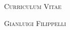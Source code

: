 \documentclass[a4paper,latin1,italian]{article}
\begin{document}
\pagestyle{empty}

\begin{center}
\huge{\textsc{Curriculum Vitae}}
\vspace{\baselineskip}

\Large{\textsc{Gianluigi Filippelli}}
\end{center}
\vspace{1.5\baselineskip}

%

%
\end{document}
